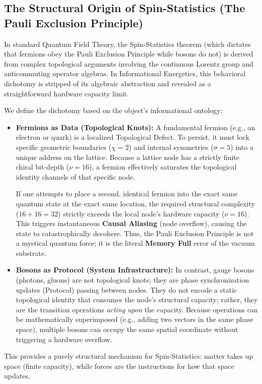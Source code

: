 \subsection{The Structural Origin of Spin-Statistics (The Pauli Exclusion Principle)}

In standard Quantum Field Theory, the Spin-Statistics theorem (which dictates that fermions obey the Pauli Exclusion Principle while bosons do not) is derived from complex topological arguments involving the continuous Lorentz group and anticommuting operator algebras. In Informational Energetics, this behavioral dichotomy is stripped of its algebraic abstraction and revealed as a straightforward hardware capacity limit.

We define the dichotomy based on the object's informational ontology:
\begin{itemize}
    \item \textbf{Fermions as Data (Topological Knots):} A fundamental fermion (e.g., an electron or quark) is a localized Topological Defect. To persist, it must lock specific geometric boundaries ($\chi=2$) and internal symmetries ($\sigma=5$) into a unique address on the lattice. Because a lattice node has a strictly finite chiral bit-depth ($\nu=16$), a fermion effectively saturates the topological identity channels of that specific node. 
    
    If one attempts to place a second, identical fermion into the exact same quantum state at the exact same location, the required structural complexity ($16 + 16 = 32$) strictly exceeds the local node's hardware capacity ($\nu=16$). This triggers instantaneous \textbf{Causal Aliasing} (node overflow), causing the state to catastrophically decohere. Thus, the Pauli Exclusion Principle is not a mystical quantum force; it is the literal \textbf{Memory Full} error of the vacuum substrate.
    
    \item \textbf{Bosons as Protocol (System Infrastructure):} In contrast, gauge bosons (photons, gluons) are not topological knots; they are phase synchronization updates (Protocol) passing between nodes. They do not encode a static topological identity that consumes the node's structural capacity; rather, they are the transition operations \textit{acting upon} the capacity. Because operations can be mathematically superimposed (e.g., adding two vectors in the same phase space), multiple bosons can occupy the same spatial coordinate without triggering a hardware overflow.
\end{itemize}

This provides a purely structural mechanism for Spin-Statistics: matter takes up space (finite capacity), while forces are the instructions for how that space updates.